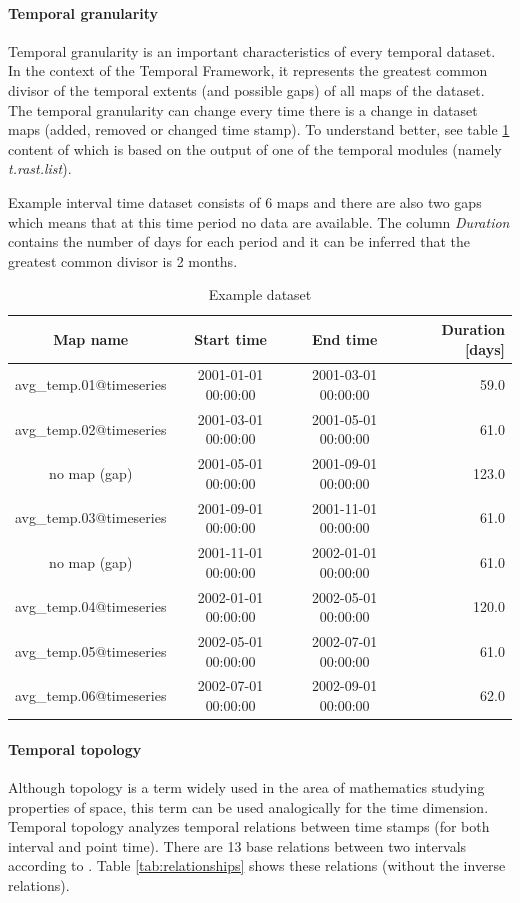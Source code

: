 \documentclass[a4paper,12pt]{book}
\newcommand{\mod}[1]{\textsl{#1}}
\newcommand{\tf}{Temporal Framework\xspace}
\begin{document}
\paragraph{Temporal granularity}
\label{sec:temporalGranularity}
Temporal granularity is an important characteristics of every temporal dataset.
In the context of the \tf , it represents the greatest common divisor
of the temporal extents (and possible gaps) of all maps of the dataset.
The temporal granularity can change every time there is a change in dataset maps
(added, removed or changed time stamp).
To understand better, see table \ref{tab:granularity} content of which is based on the output
of one of the temporal modules (namely \mod{t.rast.list}).

Example interval time dataset consists of 6 maps and
there are also two gaps which means that at this time period no data are available.
The column \emph{Duration} contains the number of days for each period and it can be inferred
that the greatest common divisor is 2 months.
\begin{table}[ht!]
  \centering
  \caption{Example dataset}
  \label{tab:granularity}
\setlength{\extrarowheight}{3pt}
\begin{tabular}{cccr}
\toprule
 Map name & Start time & End time & Duration [days]\\\midrule
avg\_temp.01@timeseries &    2001-01-01 00:00:00  &   2001-03-01 00:00:00  &   59.0\\
avg\_temp.02@timeseries  &  2001-03-01 00:00:00  &   2001-05-01 00:00:00   &  61.0\\
no map (gap)    &  2001-05-01 00:00:00    & 2001-09-01 00:00:00   &  123.0\\
avg\_temp.03@timeseries     & 2001-09-01 00:00:00   &  2001-11-01 00:00:00  &   61.0\\
no map (gap) &   2001-11-01 00:00:00   &  2002-01-01 00:00:00  &   61.0 \\
avg\_temp.04@timeseries  &    2002-01-01 00:00:00   &  2002-05-01 00:00:00     & 120.0 \\
avg\_temp.05@timeseries  &      2002-05-01 00:00:00 &    2002-07-01 00:00:00 &    61.0 \\
avg\_temp.06@timeseries &     2002-07-01 00:00:00  &   2002-09-01 00:00:00   &  62.0\\
\bottomrule
\end{tabular}
\end{table}


\paragraph{Temporal topology}
\label{sec:temporalTopology}
Although topology is a term widely used in the area of mathematics studying properties of space,
this term can be used analogically for the time dimension.
Temporal topology analyzes temporal relations between time stamps (for both interval and point time).
There are 13 base relations between two intervals according to \cite{relationships}.
Table \ref{tab:relationships} shows these relations (without the inverse relations).
\end{document}

